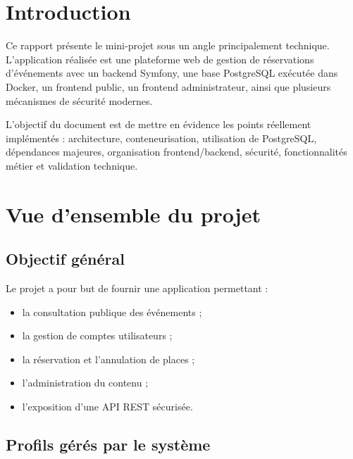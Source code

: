 \documentclass[12pt,a4paper]{report}
\begin{document}
\tableofcontents
\clearpage

\chapter*{Introduction}

Ce rapport présente le mini-projet sous un angle principalement technique. L'application réalisée est une plateforme web de gestion de réservations d'événements avec un backend Symfony, une base PostgreSQL exécutée dans Docker, un frontend public, un frontend administrateur, ainsi que plusieurs mécanismes de sécurité modernes.

L'objectif du document est de mettre en évidence les points réellement implémentés : architecture, conteneurisation, utilisation de PostgreSQL, dépendances majeures, organisation frontend/backend, sécurité, fonctionnalités métier et validation technique.

\chapter{Vue d'ensemble du projet}

\section{Objectif général}

Le projet a pour but de fournir une application permettant :
\begin{itemize}[leftmargin=1.2cm]
    \item la consultation publique des événements ;
    \item la gestion de comptes utilisateurs ;
    \item la réservation et l'annulation de places ;
    \item l'administration du contenu ;
    \item l'exposition d'une API REST sécurisée.
\end{itemize}

\section{Profils gérés par le système}
\end{document}
